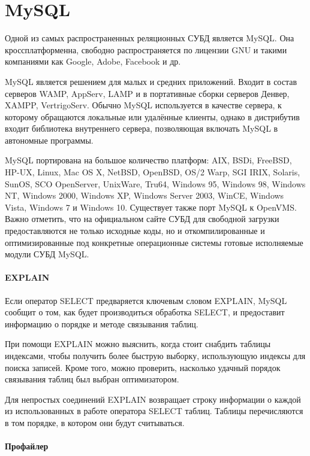\section{MySQL}

Одной из самых распространенных реляционных СУБД является MySQL. Она кроссплатформенна, свободно распространяется по лицензии GNU и такими компаниями как Google, Adobe, Facebook и др. \cite{article:tsiganov}

MySQL является решением для малых и средних приложений. Входит в состав серверов WAMP, AppServ, LAMP и в портативные сборки серверов Денвер, XAMPP, VertrigoServ. Обычно MySQL используется в качестве сервера, к которому обращаются локальные или удалённые клиенты, однако в дистрибутив входит библиотека внутреннего сервера, позволяющая включать MySQL в автономные программы. 

MySQL портирована на большое количество платформ: AIX, BSDi, FreeBSD, HP-UX, Linux, Mac OS X, NetBSD, OpenBSD, OS/2 Warp, SGI IRIX, Solaris, SunOS, SCO OpenServer, UnixWare, Tru64, Windows 95, Windows 98, Windows NT, Windows 2000, Windows XP, Windows Server 2003, WinCE, Windows Vista, Windows 7 и Windows 10. Существует также порт MySQL к OpenVMS. Важно отметить, что на официальном сайте СУБД для свободной загрузки предоставляются не только исходные коды, но и откомпилированные и оптимизированные под конкретные операционные системы готовые исполняемые модули СУБД MySQL.\cite{wikipedia.org:mysql}



\paragraph{EXPLAIN}

Если оператор SELECT предваряется ключевым словом EXPLAIN, MySQL сообщит о том, как будет производиться обработка SELECT, и предоставит информацию о порядке и методе связывания таблиц.

При помощи EXPLAIN можно выяснить, когда стоит снабдить таблицы индексами, чтобы получить более быструю выборку, использующую индексы для поиска записей. Кроме того, можно проверить, насколько удачный порядок связывания таблиц был выбран оптимизатором. 

Для непростых соединений EXPLAIN возвращает строку информации о каждой из использованных в работе оператора SELECT таблиц. Таблицы перечисляются в том порядке, в котором они будут считываться. \cite{mysql.ru:EXPLAIN}

\paragraph{Профайлер}

